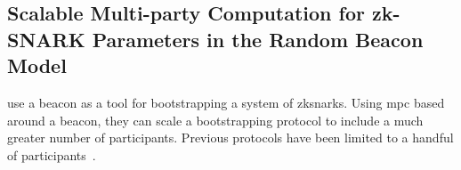 \subsection{Scalable Multi-party Computation for zk-SNARK Parameters in the Random Beacon Model}
\label{sub:scalable_mpc_zk_snarks}
\citet{mpcsnarks} use a beacon as a tool for bootstrapping a system of \gls{zksnarks}.
Using \gls{mpc} based around a beacon, they can scale a bootstrapping protocol to include a much greater number of participants.
Previous protocols have been limited to a handful of participants~\cite{snarkparameters}.
